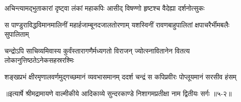 \twolineshloka
{अचिन्त्यामद्भुताकारां दृष्ट्वा लंकां महाकपिः}
{आसीद् विषण्णो हृष्टश्च वैदेह्या दर्शनोत्सुकः} %

\twolineshloka
{स पाण्डुराविद्धविमानमालिनीं महार्हजाम्बूनदजालतोरणाम्}
{यशस्विनीं रावणबाहुपालितां क्षपाचरैर्भीमबलैः सुपालिताम्} %

\twolineshloka
{चन्द्रोऽपि साचिव्यमिवास्य कुर्वंस्तारागणैर्मध्यगतो विराजन्}
{ज्योत्स्नावितानेन वितत्य लोकानुत्तिष्ठतेऽनेकसहस्ररश्मिः} %

\twolineshloka
{शङ्खप्रभं क्षीरमृणालवर्णमुद्गच्छमानं व्यवभासमानम्}
{ददर्श चन्द्रं स कपिप्रवीरः पोप्लूयमानं सरसीव हंसम्} %


॥इत्यार्षे श्रीमद्रामायणे वाल्मीकीये आदिकाव्ये सुन्दरकाण्डे निशागमप्रतीक्षा नाम द्वितीयः सर्गः ॥५-२॥
